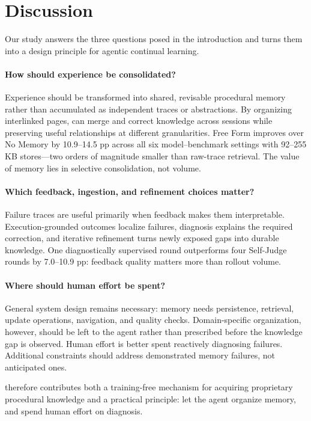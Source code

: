 
\section{Discussion}
\label{sec:discussion}

Our study answers the three questions posed in the introduction and turns them
into a design principle for agentic continual learning.

\paragraph{How should experience be consolidated?}
Experience should be transformed into shared, revisable procedural memory
rather than accumulated as independent traces or abstractions. By organizing
interlinked pages, \method{} can merge and correct knowledge across sessions
while preserving useful relationships at different granularities. Free Form
\method{} improves over No Memory by 10.9--14.5 pp across all six
model--benchmark settings with 92--255 KB stores---two orders of magnitude
smaller than raw-trace retrieval. The value of memory lies in selective
consolidation, not volume.

\paragraph{Which feedback, ingestion, and refinement choices matter?}
Failure traces are useful primarily when feedback makes them interpretable.
Execution-grounded outcomes localize failures, diagnosis explains the required
correction, and iterative refinement turns newly exposed gaps into durable
knowledge. One diagnostically supervised round outperforms four Self-Judge
rounds by 7.0--10.9 pp: feedback quality matters more than rollout volume.

\paragraph{Where should human effort be spent?}
General system design remains necessary: memory needs persistence, retrieval,
update operations, navigation, and quality checks. Domain-specific
organization, however, should be left to the agent rather than prescribed
before the knowledge gap is observed. Human effort is better spent reactively
diagnosing failures. Additional constraints should address demonstrated memory
failures, not anticipated ones.

\method{} therefore contributes both a training-free mechanism for acquiring
proprietary procedural knowledge and a practical principle: let the agent
organize memory, and spend human effort on diagnosis.


